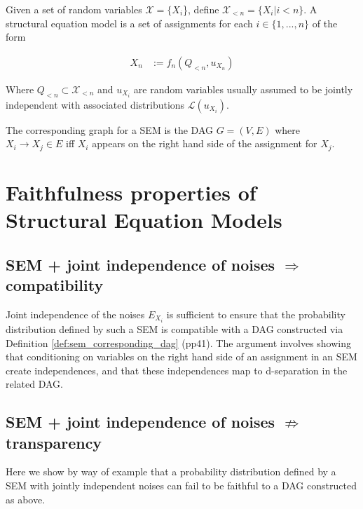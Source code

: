 \begin{definition}\label{def:structural_equation}
Given a set of random variables $\mathcal{X}=\{X_i$\}, define $\mathcal{X}_{<n}=\{X_i|i<n\}$. A structural equation model is a set of assignments for each $i\in\{1,...,n\}$ of the form

\begin{align*}
    X_n &:= f_n(Q_{<n},u_{X_n})
\end{align*}

Where $Q_{<n}\subset \mathcal{X}_{<n}$ and $u_{X_i}$ are random variables usually assumed to be jointly independent with associated distributions $\mathcal{L}(u_{X_i})$. 
\end{definition}

\begin{definition}\label{def:sem_corresponding_dag}
The corresponding graph for a SEM is the DAG $G=(V,E)$ where $X_i\to X_j\in E$ iff $X_i$ appears on the right hand side of the assignment for $X_j$.
\end{definition}

\section{Faithfulness properties of Structural Equation Models}

\subsection{SEM + joint independence of noises $\Rightarrow$ compatibility}

Joint independence of the noises $E_{X_i}$ is sufficient to ensure that the probability distribution defined by such a SEM is compatible with a DAG constructed via Definition \ref{def:sem_corresponding_dag} \cite{spirtes_causation_1993} (pp41). The argument involves showing that conditioning on variables on the right hand side of an assignment in an SEM create independences, and that these independences map to d-separation in the related DAG.

\subsection{SEM + joint independence of noises $\not\Rightarrow$ transparency}

Here we show by way of example that a probability distribution defined by a SEM with jointly independent noises can fail to be faithful to a DAG constructed as above.

